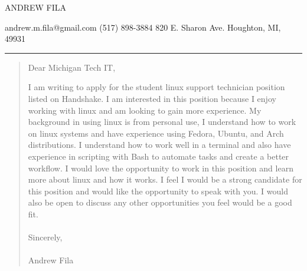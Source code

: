 \documentclass{article}
\begin{document}
\begin{center}
    \Huge ANDREW FILA
\end{center}
\faEnvelope \hspace{.05in} andrew.m.fila@gmail.com \hspace{.4in} \faPhone \hspace{.05in}(517) 898-3884\hfill \faMapMarker \hspace{.05in} 820 E. Sharon Ave. Houghton, MI, 49931
\rule{\textwidth}{.25mm}



\begin{quote}
Dear Michigan Tech IT,

    \hspace{2em} I am writing to apply for the student linux support technician position listed on Handshake. I am interested in this position because I enjoy working with linux and am looking to gain more experience. 
My background in using linux is from personal use, I understand how to work on linux systems and have experience using Fedora, Ubuntu, and Arch distributions. I understand how to work well in a terminal and also have experience in scripting with Bash to automate tasks and create a better workflow.  I would love the opportunity to work in this position and learn more about linux and how it works. 
I feel I would be a strong candidate for this position and would like the opportunity to speak with you. I would also be open to discuss any other opportunities you feel would be a good fit.  
\\\\
Sincerely,
\\\\
Andrew Fila

\end{quote}
\end{document}
